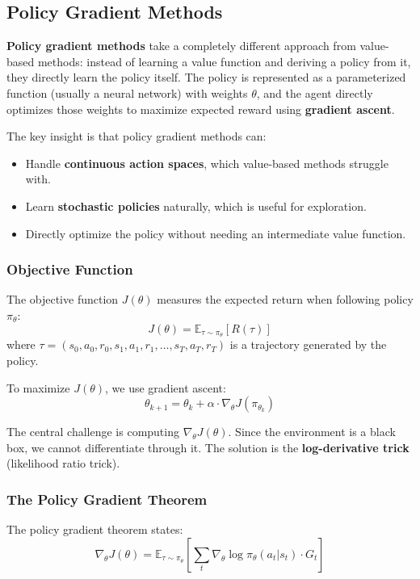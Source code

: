 \documentclass[11pt,a4paper]{article}
\begin{document}
\subsection{Policy Gradient Methods}

\textbf{Policy gradient methods} take a completely different approach from value-based methods: instead of learning a value function and deriving a policy from it, they directly learn the policy itself. The policy is represented as a parameterized function (usually a neural network) with weights $\theta$, and the agent directly optimizes those weights to maximize expected reward using \textbf{gradient ascent}.

The key insight is that policy gradient methods can:
\begin{itemize}
    \item Handle \textbf{continuous action spaces}, which value-based methods struggle with.
    \item Learn \textbf{stochastic policies} naturally, which is useful for exploration.
    \item Directly optimize the policy without needing an intermediate value function.
\end{itemize}

\subsubsection{Objective Function}

The objective function $J(\theta)$ measures the expected return when following policy $\pi_\theta$:
\[
J(\theta) = \mathbb{E}_{\tau \sim \pi_\theta}[R(\tau)]
\]
where $\tau = (s_0, a_0, r_0, s_1, a_1, r_1, \ldots, s_T, a_T, r_T)$ is a trajectory generated by the policy.

To maximize $J(\theta)$, we use gradient ascent:
\[
\theta_{k+1} = \theta_k + \alpha \cdot \nabla_\theta J(\pi_{\theta_k})
\]

The central challenge is computing $\nabla_\theta J(\theta)$. Since the environment is a black box, we cannot differentiate through it. The solution is the \textbf{log-derivative trick} (likelihood ratio trick).

\subsubsection{The Policy Gradient Theorem}

The policy gradient theorem states:
\[
\nabla_\theta J(\theta) = \mathbb{E}_{\tau \sim \pi_\theta} \left[ \sum_t \nabla_\theta \log \pi_\theta(a_t | s_t) \cdot G_t \right]
\]
\end{document}
